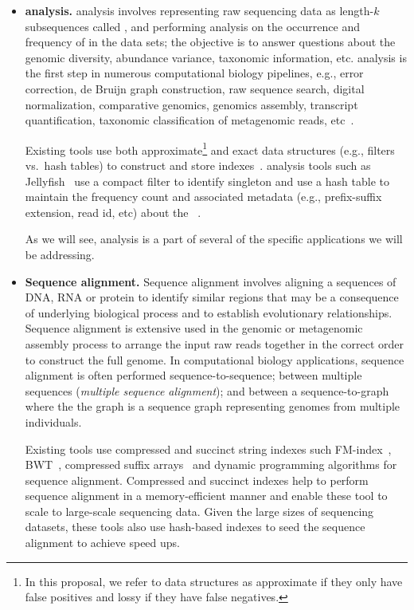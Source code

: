 \begin{itemize}[leftmargin=*]

\item {\bf \Kmer analysis.}
\Kmer analysis involves representing raw sequencing data as length-$k$ subsequences called \kmers, and performing analysis on the occurrence and frequency of \kmers in the data sets; the objective is to answer questions about the genomic diversity, abundance variance, taxonomic information, etc. \Kmer analysis is the first step in numerous computational biology pipelines, e.g., error correction, de Bruijn graph construction, raw sequence search, digital normalization, comparative genomics, genomics assembly, transcript quantification, taxonomic classification of metagenomic reads, etc~\cite{xxxx}.

Existing tools use both  approximate\footnote{In this proposal, we refer to data structures as approximate if they only have false positives and lossy if they have false negatives.} and exact data structures (e.g., filters vs.\ hash tables) to construct and store \kmer indexes~\cite{MarccaisKi11,PandeyBJP17a}.  \kmer analysis tools such as  Jellyfish~\cite{MarccaisKi11} use a compact filter to identify singleton \kmers and use a hash table to maintain the frequency count and associated metadata (e.g., prefix-suffix extension, read id, etc) about the \kmers~\cite{xxx}.

As we will see, \kmer analysis is a part of several of the specific applications we will be addressing.


\item {\bf Sequence alignment.} Sequence alignment involves aligning a sequences of DNA, RNA or protein to identify similar regions that may be a consequence of underlying biological process and to establish evolutionary relationships.
Sequence alignment is extensive used in the genomic or metagenomic assembly process to arrange the input raw reads together in the correct order to construct the full genome. In computational biology applications, sequence alignment is often performed sequence-to-sequence; between multiple sequences (\emph{multiple sequence alignment}); and between a sequence-to-graph where the the graph is a sequence graph representing genomes from multiple individuals. 

Existing tools use compressed and succinct string indexes such FM-index~\cite{ferragina2000opportunistic}, BWT~\cite{burrows1994block}, compressed suffix arrays~\cite{grossi2000compressed} and dynamic programming algorithms for sequence alignment. 
Compressed and succinct indexes help to perform sequence alignment in a memory-efficient manner and enable these tool to scale to large-scale sequencing data.
Given the large sizes of sequencing datasets, these tools also use hash-based \kmer indexes to seed the sequence alignment to achieve speed ups.


\end{itemize}

